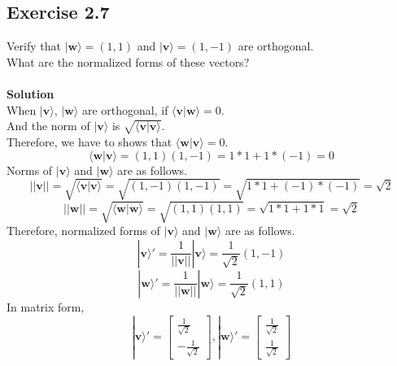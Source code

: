 \documentclass{article}
\begin{document}
\subsection{Exercise 2.7}
Verify that $|\mathbf{w}\rangle = (1,1)$ and $|\mathbf{v}\rangle = (1,-1)$ are orthogonal. \\
What are the normalized forms of these vectors? \\ \\
\textbf{Solution} \\
When $|\mathbf{v}\rangle$, $|\mathbf{w}\rangle$ are orthogonal, if $\langle\mathbf{v}|\mathbf{w}\rangle = 0$. \\
And the norm of $|\mathbf{v}\rangle$ is $\sqrt{\langle\mathbf{v}|\mathbf{v}\rangle}$. \\
Therefore, we have to shows that $\langle\mathbf{w}|\mathbf{v}\rangle = 0$. \\
\begin{equation}
    \langle\mathbf{w}|\mathbf{v}\rangle = (1,1)(1,-1) = 1 * 1 + 1 * (-1) = 0 
\end{equation}
Norms of $|\mathbf{v}\rangle$ and $|\mathbf{w}\rangle$ are as follows. \\
\begin{equation}
    ||\mathbf{v}|| = \sqrt{\langle\mathbf{v}|\mathbf{v}\rangle} = \sqrt{(1,-1)(1,-1)} = \sqrt{1 * 1 + (-1) * (-1)} = \sqrt{2}
\end{equation}
\begin{equation}
    ||\mathbf{w}|| = \sqrt{\langle\mathbf{w}|\mathbf{w}\rangle} = \sqrt{(1,1)(1,1)} = \sqrt{1 * 1 + 1 * 1} = \sqrt{2}
\end{equation}
Therefore, normalized forms of $|\mathbf{v}\rangle$ and $|\mathbf{w}\rangle$ are as follows. \\
\begin{equation}
    |\mathbf{v}\rangle' = \frac{1}{||\mathbf{v}||} |\mathbf{v}\rangle = \frac{1}{\sqrt{2}} (1,-1)
\end{equation}
\begin{equation}
    |\mathbf{w}\rangle' = \frac{1}{||\mathbf{w}||} |\mathbf{w}\rangle = \frac{1}{\sqrt{2}} (1,1)
\end{equation}
In matrix form, 
\begin{equation}
    |\mathbf{v}\rangle' = 
    \begin{bmatrix}
        \frac{1}{\sqrt{2}} \\
        -\frac{1}{\sqrt{2}}
    \end{bmatrix}
    , |\mathbf{w}\rangle' =
    \begin{bmatrix}
        \frac{1}{\sqrt{2}} \\
        \frac{1}{\sqrt{2}}
    \end{bmatrix}
\end{equation}
\end{document}
